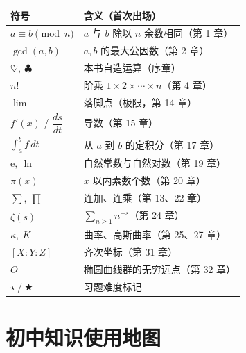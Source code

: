 \begin{center}
\begin{longtable}{lp{}}
\toprule
符号 & 含义（首次出场） \\
\midrule
\endhead
$a \equiv b \pmod n$ & $a$ 与 $b$ 除以 $n$ 余数相同（第 1 章） \\
$\gcd(a,b)$ & $a,b$ 的最大公因数（第 2 章） \\
$\heartsuit,\ \clubsuit$ & 本书自造运算（序章） \\
$n!$ & 阶乘 $1\times2\times\cdots\times n$（第 4 章） \\
$\lim$ & 落脚点（极限，第 14 章） \\
$f'(x)$ / $\dfrac{ds}{dt}$ & 导数（第 15 章） \\
$\displaystyle\int_a^b f\,dt$ & 从 $a$ 到 $b$ 的定积分（第 17 章） \\
$\mathrm{e},\ \ln$ & 自然常数与自然对数（第 19 章） \\
$\pi(x)$ & $x$ 以内素数个数（第 20 章） \\
$\displaystyle\sum,\ \prod$ & 连加、连乘（第 13、22 章） \\
$\zeta(s)$ & $\displaystyle\sum_{n\ge1} n^{-s}$（第 24 章） \\
$\kappa,\ K$ & 曲率、高斯曲率（第 25、27 章） \\
$[X:Y:Z]$ & 齐次坐标（第 31 章） \\
$O$ & 椭圆曲线群的无穷远点（第 32 章） \\
$\star\ /\ \bigstar$ & 习题难度标记 \\
\bottomrule
\end{longtable}
\end{center}

\chapter{初中知识使用地图}

